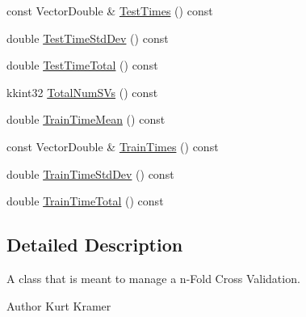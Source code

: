 \begin{DoxyCompactItemize}
\item 
const Vector\+Double \& \hyperlink{class_k_k_m_l_l_1_1_cross_validation_a628d5fb4ed5003fc04aa935fcc524599}{Test\+Times} () const 
\item 
double \hyperlink{class_k_k_m_l_l_1_1_cross_validation_a5beb388b3b669ccfa57011f7b15cdce6}{Test\+Time\+Std\+Dev} () const 
\item 
double \hyperlink{class_k_k_m_l_l_1_1_cross_validation_a1fd0e6976ebcd0f0c8321ef4f5405c65}{Test\+Time\+Total} () const 
\item 
kkint32 \hyperlink{class_k_k_m_l_l_1_1_cross_validation_aa39e78b6edb6eb28c01d5f3fc2cd5d8b}{Total\+Num\+S\+Vs} () const 
\item 
double \hyperlink{class_k_k_m_l_l_1_1_cross_validation_aa6a2b5a1ec8563e9d455d09a1e7805f1}{Train\+Time\+Mean} () const 
\item 
const Vector\+Double \& \hyperlink{class_k_k_m_l_l_1_1_cross_validation_ad64cb5c083eec275fc09a9a284fbbb2e}{Train\+Times} () const 
\item 
double \hyperlink{class_k_k_m_l_l_1_1_cross_validation_a03f73a5211b96f85f473cbb6a3f25b4c}{Train\+Time\+Std\+Dev} () const 
\item 
double \hyperlink{class_k_k_m_l_l_1_1_cross_validation_aafc80f2e1e3234c918251cb0c172cdd8}{Train\+Time\+Total} () const 
\end{DoxyCompactItemize}


\subsection{Detailed Description}
A class that is meant to manage a n-\/\+Fold Cross Validation. 

\begin{DoxyAuthor}{Author}
Kurt Kramer
\end{DoxyAuthor}

